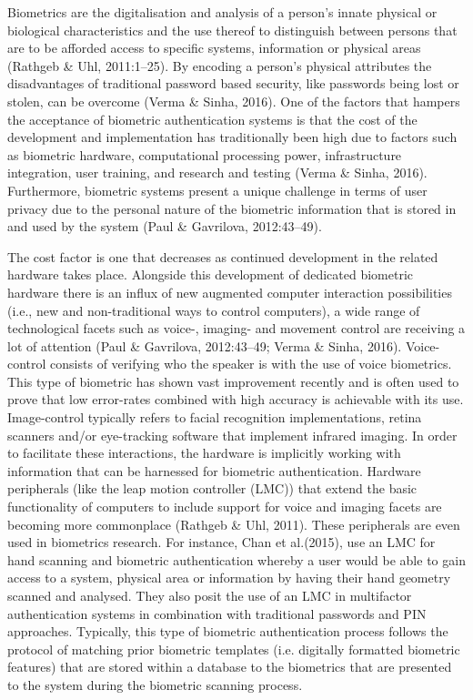 Biometrics are the digitalisation and analysis of a person’s innate physical or biological characteristics and the use thereof to distinguish between persons that are to be afforded access to specific systems, information or physical areas (Rathgeb \& Uhl, 2011:1–25). By encoding a person’s physical attributes the disadvantages of traditional password based security, like passwords being lost or stolen, can be overcome (Verma \& Sinha, 2016). One of the factors that hampers the acceptance of biometric authentication systems is that the cost of the development and implementation has traditionally been high due to factors such as biometric hardware, computational processing power, infrastructure integration, user training, and research and testing (Verma \& Sinha, 2016). Furthermore, biometric systems present a unique challenge in terms of user privacy due to the personal nature of the biometric information that is stored in and used by the system (Paul \& Gavrilova, 2012:43–49).

The cost factor is one that decreases as continued development in the related hardware takes place. Alongside this development of dedicated biometric hardware there is an influx of new augmented computer interaction possibilities (i.e., new and non-traditional ways to control computers), a wide range of technological facets such as voice-, imaging- and movement control are receiving a lot of attention (Paul \& Gavrilova, 2012:43–49; Verma \& Sinha, 2016). Voice-control consists of verifying who the speaker is with the use of voice biometrics. This type of biometric has shown vast improvement recently and is often used to prove that low error-rates combined with high accuracy is achievable with its use. Image-control typically refers to facial recognition implementations, retina scanners and/or eye-tracking software that implement infrared imaging. In order to facilitate these interactions, the hardware is implicitly working with information that can be harnessed for biometric authentication. Hardware peripherals (like the leap motion controller (LMC)) that extend the basic functionality of computers to include support for voice and imaging facets are becoming more commonplace (Rathgeb \& Uhl, 2011). These peripherals are even used in biometrics research. For instance, Chan et al.(2015), use an LMC for hand scanning and biometric authentication whereby a user would be able to gain access to a system, physical area or information by having their hand geometry scanned and analysed. They also posit the use of an LMC in multifactor authentication systems in combination with traditional passwords and PIN approaches. 
Typically, this type of biometric authentication process follows the protocol of matching prior biometric templates (i.e. digitally formatted biometric features) that are stored within a database to the biometrics that are presented to the system during the biometric scanning process. 

